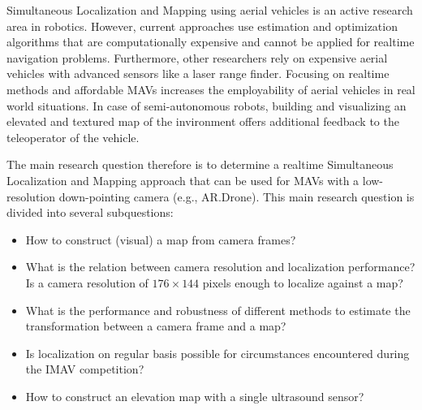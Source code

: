 Simultaneous Localization and Mapping using aerial vehicles is an active research area in robotics.
However, current approaches use estimation and optimization algorithms that are computationally expensive and cannot be applied for realtime navigation problems.
Furthermore, other researchers rely on expensive aerial vehicles
with advanced sensors like a laser range finder.
Focusing on realtime methods and affordable MAVs increases the employability of aerial vehicles in real world situations.
In case of semi-autonomous robots, building and visualizing an elevated and textured map of the invironment offers additional feedback to the teleoperator of the vehicle.

The main research question therefore is to determine a realtime Simultaneous Localization and Mapping approach that can be used for MAVs with a low-resolution down-pointing camera (e.g., AR.Drone).
This main research question is divided into several subquestions:
\begin{itemize}
\item How to construct (visual) a map from camera frames?
\item What is the relation between camera resolution and localization performance? Is a camera resolution of $176 \times 144$ pixels enough to localize against a map?
\item What is the performance and robustness of different methods to estimate the transformation between a camera frame and a map?
\item Is localization on regular basis possible for circumstances encountered during the IMAV competition?
\item How to construct an elevation map with a single ultrasound sensor?
\end{itemize}


